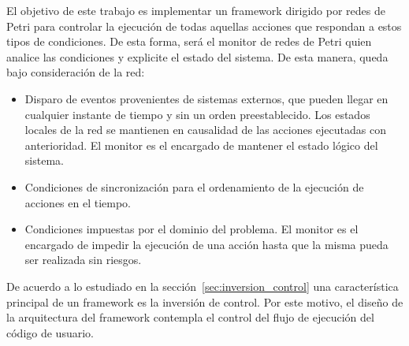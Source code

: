 El objetivo de este trabajo es implementar un framework dirigido por redes de
Petri para controlar la ejecución de todas aquellas acciones que respondan a
estos tipos de condiciones.
De esta forma, será el monitor de redes de Petri quien analice las condiciones y
explicite el estado del sistema. De esta manera, queda bajo consideración de la red:
\begin{itemize}
  \item Disparo de eventos provenientes de sistemas externos, que pueden llegar
  en cualquier instante de tiempo y sin un orden preestablecido. Los estados
  locales de la red se mantienen en causalidad de las acciones ejecutadas con
  anterioridad. El monitor es el encargado de mantener el estado lógico del
  sistema.
  
  \item Condiciones de sincronización para el ordenamiento de la ejecución de
  acciones en el tiempo. 
  
  \item Condiciones impuestas por el dominio del problema. El monitor es el
  encargado de impedir la ejecución de una acción hasta que la misma pueda ser
  realizada sin riesgos.
\end{itemize}

De acuerdo a lo estudiado en la sección~\ref{sec:inversion_control} una
característica principal de un framework es la inversión de control. Por este
motivo, el diseño de la arquitectura del framework contempla el control del
flujo de ejecución del código de usuario.

